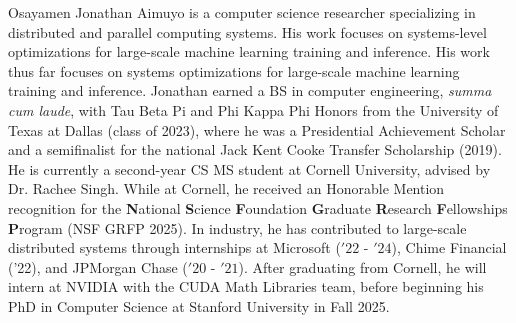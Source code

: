 \begin{biosketch}
Osayamen Jonathan Aimuyo is a computer science researcher specializing in distributed and parallel computing systems.
His work focuses on systems-level optimizations for large-scale machine learning training and inference.
His work thus far focuses on systems optimizations for large-scale machine learning training and inference.
Jonathan earned a BS in computer engineering, \textit{summa cum laude}, with Tau Beta Pi and Phi Kappa Phi Honors from the
University of Texas at Dallas (class of 2023),
where he was a Presidential Achievement Scholar and a semifinalist
for the national Jack Kent Cooke Transfer Scholarship (2019).
He is currently a second-year CS MS student at Cornell University,
advised by Dr. Rachee Singh.
While at Cornell, he received an Honorable Mention recognition for the
\textbf{N}ational \textbf{S}cience \textbf{F}oundation \textbf{G}raduate \textbf{R}esearch \textbf{F}ellowships
\textbf{P}rogram (NSF GRFP 2025).
In industry, he has contributed to large-scale distributed systems through internships at
Microsoft (\('22\) - \('24\)), Chime Financial ('22), and JPMorgan Chase (\('20\) - \('21\)).
After graduating from Cornell, he will intern at NVIDIA with the CUDA Math Libraries team,
before beginning his PhD in Computer Science at Stanford University in Fall 2025.
\end{biosketch}